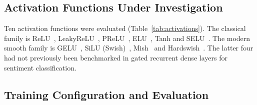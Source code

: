 \subsection{Activation Functions Under Investigation}

Ten activation functions were evaluated
(Table~\ref{tab:activations}). The classical family is
ReLU~\cite{nair2010}, LeakyReLU~\cite{maas2013},
PReLU~\cite{he2015}, ELU~\cite{clevert2015}, Tanh and
SELU~\cite{klambauer2017}. The modern smooth family is
GELU~\cite{hendrycks2016}, SiLU (Swish)~\cite{ramachandran2017},
Mish~\cite{misra2020} and Hardswish~\cite{howard2019}. The latter
four had not previously been benchmarked in gated recurrent dense
layers for sentiment classification.

\begin{table}[htbp]
  \caption{Activation Functions: Families and Key Properties}
  \label{tab:activations}
  \centering\footnotesize
  \setlength{\tabcolsep}{3pt}
  \renewcommand{\arraystretch}{1.05}
\end{table}

\subsection{Training Configuration and Evaluation}

